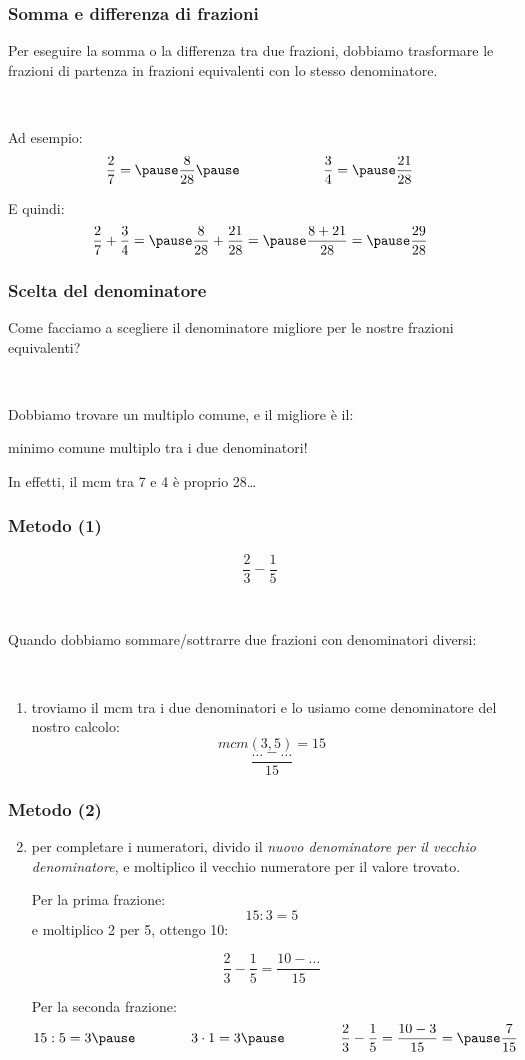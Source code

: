 \documentclass[]{beamer}
\theoremstyle{plain}
\begin{document}
\begin{frame}
\frametitle{Somma e differenza di frazioni}
Per eseguire la somma o la differenza tra due frazioni, dobbiamo \alert{trasformare} le frazioni di partenza in frazioni equivalenti con \alert{lo stesso denominatore}.\pause

~

Ad esempio:
\[ \frac{2}{7} =\pause \frac{8}{28}\pause \qquad\qquad\qquad\frac{3}{4}=\pause\frac{21}{28} \]\pause

E quindi:
\[ \frac{2}{7} + \frac{3}{4}  =\pause \frac{8}{28}+ \frac{21}{28} =\pause\frac{8+21}{28}=\pause \frac{29}{28}\]
\end{frame}



\begin{frame}
\frametitle{Scelta del denominatore}
Come facciamo a scegliere il \alert{denominatore migliore} per le nostre frazioni equivalenti?\pause

~

Dobbiamo trovare un \alert{multiplo comune}, e il migliore è il:\pause
\begin{center}
  \alert{minimo comune multiplo tra i due denominatori!}
\end{center}\pause

In effetti, il mcm tra 7 e 4 è proprio 28\ldots
\end{frame}



\begin{frame}
\frametitle{Metodo (1)}
\[\frac{2}{3} - \frac{1}{5}\]\pause

~

Quando dobbiamo sommare/sottrarre due frazioni con denominatori diversi:

~

\begin{enumerate}
  \item troviamo il mcm tra i due denominatori e lo usiamo come denominatore del nostro calcolo:\pause
  \[ mcm(3,5) = 15 \]\pause
  \[ \frac{\ldots - \ldots}{15} \]
\end{enumerate}
\end{frame}





\begin{frame}
\frametitle{Metodo (2)}
\begin{enumerate}\setcounter{enumi}{1}
  \item per completare i numeratori, divido il \emph{nuovo denominatore per il vecchio denominatore}, e moltiplico il vecchio numeratore per il valore trovato.\pause
  
  Per la prima frazione:
  \[ 15 : 3 = 5 \]\pause
  e moltiplico 2 per 5, ottengo 10:\pause

  \[\frac{2}{3} - \frac{1}{5} = \frac{10 - \ldots}{15} \]\pause

  Per la seconda frazione:
  \[ 15 : 5 = 3\pause\qquad\qquad3\cdot1=3\pause\qquad\qquad\frac{2}{3} - \frac{1}{5} = \frac{10 - 3}{15} =\pause \frac{7}{15}\]
\end{enumerate}
\end{frame}
\end{document}
